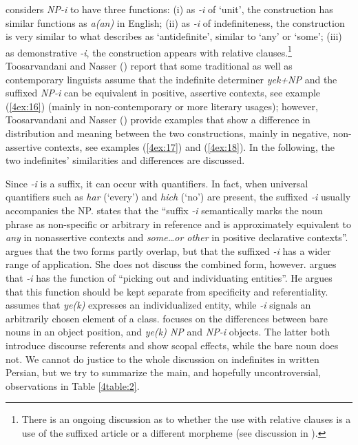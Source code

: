 \documentclass[output=paper]{langsci/langscibook}
\begin{document}
\cite{windfuhr:79} considers {\emph{NP-i}} to have three functions: (i) as {\emph{-i}} of `unit', the construction has similar functions as {\emph{a(an)}} in English; (ii) as {\emph{-i}} of indefiniteness, the construction is very similar to what \cite{jasbi:16} describes as `antidefinite', similar to `any' or `some'; (iii) as demonstrative {\emph{-i}}, the construction appears with relative clauses.\footnote{There is an ongoing discussion as to whether the use with relative clauses is a use of the suffixed article or a different morpheme (see discussion in \citealt[][65]{ghomeshi:03}).} Toosarvandani and Nasser (\citeyear{toosarvandani:nasser:17}) report that some traditional \citep{lambton:53} as well as contemporary linguists \citep{ghomeshi:03} assume that the indefinite determiner {\emph{yek+NP}} and the suffixed {\emph{NP-i}} can be equivalent in positive, assertive contexts, see example (\ref{4ex:16}) (mainly in non-contemporary or more literary usages); however, Toosarvandani and Nasser (\citeyear{toosarvandani:nasser:17}) provide examples that show a difference in distribution and meaning between the two constructions, mainly in negative, non-assertive contexts, see examples (\ref{4ex:17}) and (\ref{4ex:18}). In the following, the two indefinites' similarities and differences are discussed.

{
Since {\emph{-i}} is a suffix, it can occur with quantifiers. In fact, when universal quantifiers such as {\emph{har}} (`every') and {\emph{hich}} (`no') are present, the suffixed {\emph{-i}} usually accompanies the NP. \cite[][90]{lyons:99} states that the ``suffix {\emph{-i}} semantically marks the noun phrase as non-specific or arbitrary in reference and is approximately equivalent to {\emph{any}} in nonassertive contexts and {\emph{some…or other}} in positive declarative contexts''. \cite[][64-65]{ghomeshi:03} argues that the two forms partly overlap, but that the suffixed {\emph{-i}} has a wider range of application. She does not discuss the combined form, however. \cite[][325]{paul:08} argues that {\emph{-i}} has the function of ``picking out and individuating entities''. He argues that this function should be kept separate from specificity and referentiality. \cite[][169-170]{hincha:61} assumes that {\emph{ye(k)}} expresses an individualized entity, while {\emph{-i}} signals an arbitrarily chosen element of a class. \cite[][16-19]{modarresi:14} focuses on the differences between bare nouns in an object position, and {\emph{ye(k) NP}} and {\emph{NP-i}} objects. The latter both introduce discourse referents and show scopal effects, while the bare noun does not. We cannot do justice to the whole discussion on indefinites in written Persian, but we try to summarize the main, and hopefully uncontroversial, observations in Table \ref{4table:2}.
}
\end{document}
